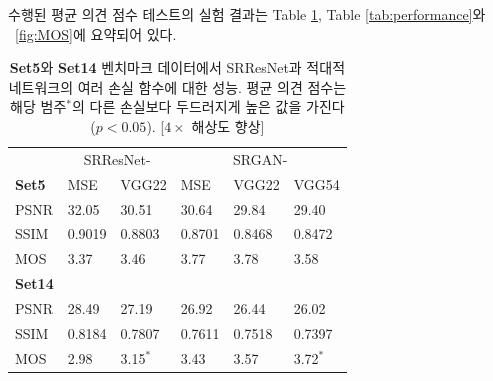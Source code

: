 \documentclass[10pt,twocolumn,letterpaper]{article}
\newcommand{\kor}[1]{#1}
\newcommand{\eng}[1]{}
\newcommand{\summary}[1]{}
\begin{document}
\summary{
평균 의견 점수 테스트를 통해 평가자들에게 다양한 초해상도화 방법의 평가를 요청하여, 이미지 품질을 정량화하고 평가의 일관성을 확인했음.
}

\eng{
The experimental results of the conducted \ac{MOS} tests are summarized in Table \ref{tab:perceptual}, Table \ref{tab:performance} and \figurename~\ref{fig:MOS}.
}\kor{
수행된 \ac{평균 의견 점수} 테스트의 실험 결과는 Table \ref{tab:perceptual}, Table \ref{tab:performance}와 \figurename~\ref{fig:MOS}에 요약되어 있다.
}

\summary{
평균 의견 점수 테스트 결과 제시
}

\begin{table}[]
\centering
\caption{\eng{Performance of different loss functions for SRResNet and the adversarial networks on Set5 and Set14 benchmark data. MOS score significantly higher ($p<0.05$) than with other losses in that category$^*$. [$4\times$ upscaling]}\kor{
\textbf{Set5}와 \textbf{Set14} 벤치마크 데이터에서 SRResNet과 적대적 네트워크의 여러 손실 함수에 대한 성능. 평균 의견 점수는
해당 범주$^*$의 다른 손실보다 두드러지게 높은 값을 가진다 ($p<0.05$). [$4\times$ 해상도 향상]
}}
\label{tab:perceptual}
\begin{adjustbox}{max width=0.48\textwidth}
\begin{tabular}{lll | lll}
& \multicolumn{2}{c}{SRResNet-} & \multicolumn{3}{c}{SRGAN-} \\
\textbf{Set5} & MSE & VGG22 & MSE & VGG22 & VGG54 \\
\hline

PSNR &  32.05 & 30.51 & 30.64 & 29.84 & 29.40 \\
SSIM & 0.9019 & 0.8803 & 0.8701 & 0.8468 & 0.8472 \\
MOS  &  3.37 & 3.46 & 3.77 & 3.78 & 3.58 \\ [0.3cm]
\textbf{Set14} & & &  \\
\hline
PSNR &  28.49 & 27.19 & 26.92 & 26.44 & 26.02 \\
SSIM &  0.8184 & 0.7807 & 0.7611 & 0.7518 & 0.7397 \\
MOS  &  2.98 & 3.15$^*$ & 3.43 & 3.57 & 3.72$^*$  \\
\end{tabular}
\end{adjustbox}
\end{table}
\end{document}
